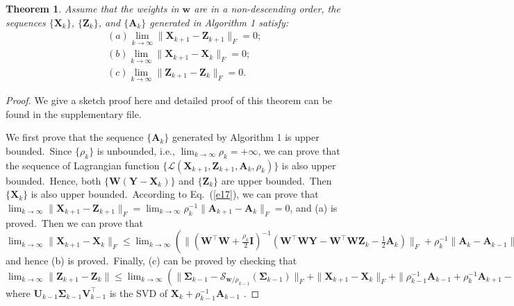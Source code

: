 \documentclass[10pt,twocolumn,letterpaper]{article}
\newtheorem{theorem}{Theorem}
\begin{document}
\vspace{-1mm}
\begin{theorem}
\label{th1}
Assume that the weights in $\bm{w}$ are in a non-descending order, the sequences $\{\mathbf{X}_{k}\}$, $\{\mathbf{Z}_{k}\}$, and $\{\mathbf{A}_{k}\}$ generated in Algorithm 1 satisfy:
\vspace{-3mm}
\begin{align}
&(a) \lim_{k \to \infty} \|\mathbf{X}_{k+1}-\mathbf{Z}_{k+1}\|_{F}=0;
\\
&(b) \lim_{k \to \infty} \|\mathbf{X}_{k+1}-\mathbf{X}_{k}\|_{F}=0;
\\
&(c) \lim_{k \to \infty} \|\mathbf{Z}_{k+1}-\mathbf{Z}_{k}\|_{F}=0.
\end{align}
\end{theorem}
\vspace{-5mm}
\begin{proof}
We give a sketch proof here and detailed proof of this theorem can be found in the supplementary file. 

We first prove that the sequence $\{\mathbf{A}_{k}\}$ generated by Algorithm 1 is upper bounded.\ Since $\{\rho_{k}\}$ is unbounded, i.e., $\lim_{k\to\infty}{\rho_{k}}=+\infty$, we can prove that the sequence of Lagrangian function $\{\mathcal{L}(\mathbf{X}_{k+1},\mathbf{Z}_{k+1},\mathbf{A}_{k},\rho_{k})\}$ is also upper bounded.\ Hence, both $\{\mathbf{W}(\mathbf{Y}-\mathbf{X}_{k})\}$ and $\{\mathbf{Z}_{k}\}$ are upper bounded.\ Then $\{\mathbf{X}_{k}\}$ is also upper bounded.\ According to Eq.\ (\ref{e17}), we can prove that 
$
\lim_{k \to \infty} 
\|
\mathbf{X}_{k+1}
-
\mathbf{Z}_{k+1}
\|_{F}
=
\lim_{k \to \infty} 
\rho_{k}^{-1}
\|
\mathbf{A}_{k+1}
-
\mathbf{A}_{k}
\|_{F}
=
0
$,
and (a) is proved.\ Then we can prove that 
$
\lim_{k \to \infty} 
\|
\mathbf{X}_{k+1}
-
\mathbf{X}_{k}
\|_{F}
\le
\lim_{k \to \infty} 
(\|
(\mathbf{W}^{\top}\mathbf{W}
+
\frac{\rho_{k}}{2}
\mathbf{I})^{-1}
(\mathbf{W}^{\top}\mathbf{W}\mathbf{Y}
-
\mathbf{W}^{\top}\mathbf{W}\mathbf{Z}_{k}
-
\frac{1}{2}
\mathbf{A}_{k})
\|_{F}
+
\rho_{k}^{-1}\|
\mathbf{A}_{k}-\mathbf{A}_{k-1}
\|_{F})
=
0
$
and hence (b) is proved.\ Finally, (c) can be proved by checking that 
$
\lim_{k \to \infty} \|\mathbf{Z}_{k+1}-\mathbf{Z}_{k}\|
\le
\lim_{k \to \infty} 
(\|
\mathbf{\Sigma}_{k-1}-\mathcal{S}_{\bm{w}/\rho_{k-1}}(\mathbf{\Sigma}_{k-1})
\|_{F}
+
\|
\mathbf{X}_{k+1}-\mathbf{X}_{k}
\|_{F}
+
\|
\rho_{k-1}^{-1}\mathbf{A}_{k-1}
+
\rho_{k}^{-1}\mathbf{A}_{k+1}
-
\rho_{k}^{-1}\mathbf{A}_{k}
\|_{F})
=
0,
$
where $\mathbf{U}_{k-1}\mathbf{\Sigma}_{k-1}\mathbf{V}_{k-1}^{\top}$ is the SVD of $\mathbf{X}_{k}+\rho_{k-1}^{-1}\mathbf{A}_{k-1}$
.
\vspace{-2mm}
\end{proof}
\end{document}
